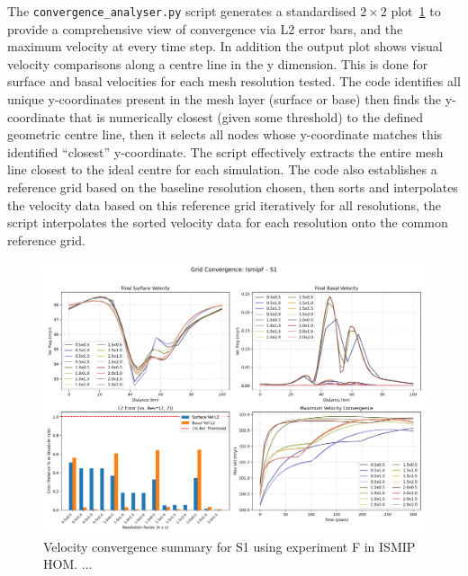 The \texttt{convergence\_analyser.py} script generates a standardised $2\times2$ plot~\ref{fig:grid_conv} to provide a comprehensive view of convergence via L2 error bars, and the maximum velocity at every time step. In addition the output plot shows visual velocity comparisons along a centre line in the y dimension. This is done for surface and basal velocities for each mesh resolution tested. The code identifies all unique y-coordinates present in the mesh layer (surface or base) then finds the y-coordinate that is numerically closest (given some threshold) to the defined geometric centre line, then it selects all nodes whose y-coordinate matches this identified ``closest'' y-coordinate. The script effectively extracts the entire mesh line closest to the ideal centre for each simulation. The code also establishes a reference grid based on the baseline resolution chosen, then sorts and interpolates the velocity data based on this reference grid iteratively for all resolutions, the script interpolates the sorted velocity data for each resolution onto the common reference grid. 

\begin{figure}[H]
    \includegraphics[scale=0.49]{IsmipF_S1_convergence_summary.png}
    \caption{Velocity convergence summary for S1 using experiment F in ISMIP HOM. ...}
    \label{fig:grid_conv}
\end{figure}

